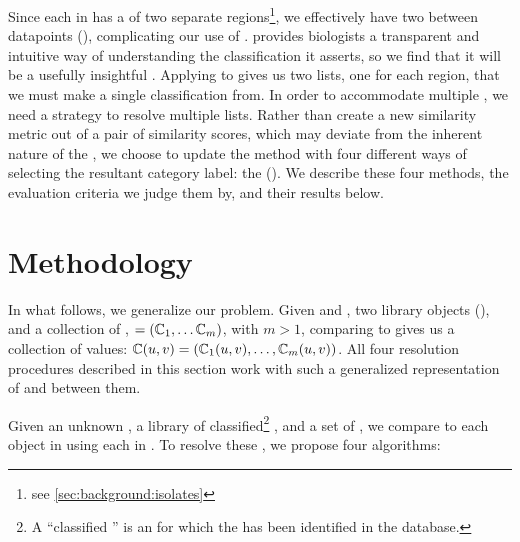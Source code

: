 Since each \ecoli{} \isol{} in \cplop{} has a \pyro{} of two separate \itsshort{} regions\footnote{see \autoref{sec:background:isolates}}, we effectively have two \compfuncs{} between datapoints (\isols{}), complicating our use of \kNN{}.
\kNN{} provides \cplop{} biologists a transparent and intuitive way of understanding the \spec{} classification it asserts, so we find that it will be a usefully insightful .
Applying \kNN{} to \cplop{} \isols{} gives us two lists, one for each \itsshort{} region, that we must make a single \spec{} classification from.
In order to accommodate multiple \compfuncs{}, we need a strategy to resolve multiple \knnlong{} lists.
Rather than create a new similarity metric out of a pair of similarity scores, which may deviate from the inherent nature of the \compfunc{}, we choose to update the \kNN{} method with four different ways of selecting the resultant category label: the \kraplong{} (\krap{}).
We describe these four methods, the evaluation criteria we judge them by, and their results below.

\section{Methodology}\label{sec:methodology:krap}

In what follows, we generalize our problem. Given \UNKNOWN{} and \KNOWN{}, two library objects (\isols{}), and a collection of \compfuncs{}, \COMP{}$=(\mathbb{C}{}_1,\ldots \mathbb{C}{}_m)$, with $m > 1$, comparing \UNKNOWN{} to \KNOWN{} gives us a collection of values:  
$\mathbb{C}{}(u{},v{}) = (\mathbb{C}{}_1(u{},v{}),\ldots,\mathbb{C}{}_m(u{},v{}))$.
All four resolution procedures described in this section work with such a generalized representation of \isols{} and \compfuncs{} between them.

Given an unknown \isol{} \UNKNOWN{}, a library of classified\footnote{A ``classified \isol{}'' is an \isol{} for which the \spec{} has been identified in the database.} \isols{} \LIB{}, and a set of \compfuncs{} \COMP{}, we compare \UNKNOWN{} to each object in \LIB{} using each \compfunc{} in \COMP{}. To resolve these \compfuncs{}, we propose four algorithms:

